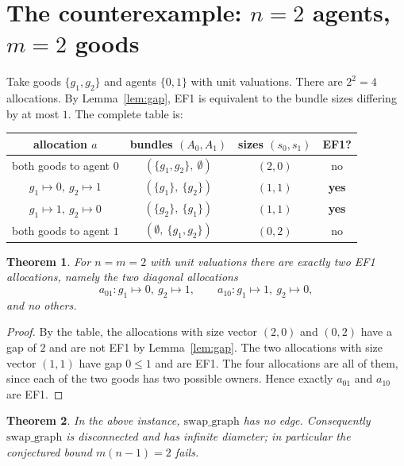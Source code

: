 \documentclass[11pt]{article}
\newtheorem{theorem}{Theorem}
\theoremstyle{definition}
\theoremstyle{remark}
\newcommand{\swapgraph}{\mathrm{swap\_graph}}
\begin{document}
\section{The counterexample: $n = 2$ agents, $m = 2$ goods}

Take goods $\{g_1,g_2\}$ and agents $\{0,1\}$ with unit valuations. There are
$2^2 = 4$ allocations. By Lemma~\ref{lem:gap}, EF1 is equivalent to the bundle
sizes differing by at most $1$. The complete table is:

\begin{center}
\begin{tabular}{c|c|c|c}
allocation $a$ & bundles $(A_0, A_1)$ & sizes $(s_0, s_1)$ & EF1? \\
\hline
both goods to agent $0$ & $(\{g_1,g_2\},\ \emptyset)$ & $(2,0)$ & no \\
$g_1 \mapsto 0,\ g_2 \mapsto 1$ & $(\{g_1\},\ \{g_2\})$ & $(1,1)$ & \textbf{yes} \\
$g_1 \mapsto 1,\ g_2 \mapsto 0$ & $(\{g_2\},\ \{g_1\})$ & $(1,1)$ & \textbf{yes} \\
both goods to agent $1$ & $(\emptyset,\ \{g_1,g_2\})$ & $(0,2)$ & no \\
\end{tabular}
\end{center}

\begin{theorem}\label{thm:two-ef1}
For $n = m = 2$ with unit valuations there are exactly two EF1 allocations,
namely the two diagonal allocations
\[
a_{01} : g_1 \mapsto 0,\ g_2 \mapsto 1,
\qquad
a_{10} : g_1 \mapsto 1,\ g_2 \mapsto 0,
\]
and no others.
\end{theorem}

\begin{proof}
By the table, the allocations with size vector $(2,0)$ and $(0,2)$ have a gap of
$2$ and are not EF1 by Lemma~\ref{lem:gap}. The two allocations with size vector
$(1,1)$ have gap $0 \le 1$ and are EF1. The four allocations are all of them,
since each of the two goods has two possible owners. Hence exactly $a_{01}$ and
$a_{10}$ are EF1.
\end{proof}

\begin{theorem}\label{thm:no-edge}
In the above instance, $\swapgraph$ has no edge. Consequently $\swapgraph$ is
disconnected and has infinite diameter; in particular the conjectured bound
$m(n-1) = 2$ fails.
\end{theorem}
\end{document}
